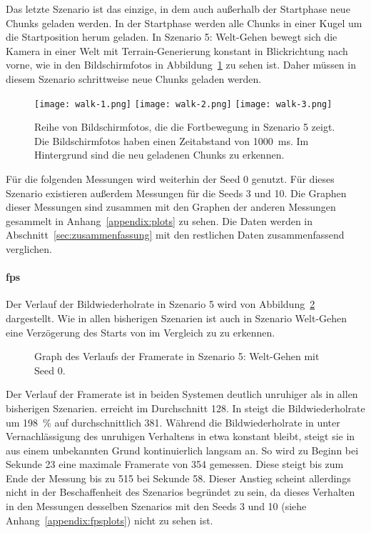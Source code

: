 Das letzte Szenario ist das einzige, in dem auch außerhalb der Startphase neue Chunks geladen werden. In der Startphase werden alle Chunks in einer Kugel um die Startposition herum geladen. In Szenario 5: Welt-Gehen bewegt sich die Kamera in einer Welt mit Terrain-Generierung konstant in Blickrichtung nach vorne, wie in den Bildschirmfotos in Abbildung~\ref{fig:walk} zu sehen ist. Daher müssen in diesem Szenario schrittweise neue Chunks geladen werden.
\begin{figure}[!htbp]
	\centering
	\texttt{[image: walk-1.png]}
	\texttt{[image: walk-2.png]}
	\texttt{[image: walk-3.png]}
	\caption[Reihe von Bildschirmfotos, die die Fortbewegung in Szenario 5 zeigt.]{Reihe von Bildschirmfotos, die die Fortbewegung in Szenario 5 zeigt. Die Bildschirmfotos haben einen Zeitabstand von \SI{1000}{\milli\second}. Im Hintergrund sind die neu geladenen Chunks zu erkennen.}\label{fig:walk}
\end{figure}

Für die folgenden Messungen wird weiterhin der Seed 0 genutzt. Für dieses Szenario existieren außerdem Messungen für die Seeds 3 und 10. Die Graphen dieser Messungen sind zusammen mit den Graphen der anderen Messungen gesammelt in Anhang~\vref{appendix:plots} zu sehen. Die Daten werden in Abschnitt~\ref{sec:zusammenfassung} mit den restlichen Daten zusammenfassend verglichen.

\paragraph{\ac{fps}}
Der Verlauf der Bildwiederholrate in Szenario 5 wird von Abbildung~\ref{fig:seed-0-walk-fps} dargestellt. Wie in allen bisherigen Szenarien ist auch in Szenario Welt-Gehen eine Verzögerung des Starts von \sysB{} im Vergleich zu \sysA{} zu erkennen.
\begin{figure}[!htbp]
	\caption{Graph des Verlaufs der Framerate in Szenario 5: Welt-Gehen mit Seed 0.}\label{fig:seed-0-walk-fps}
\end{figure}
Der Verlauf der Framerate ist in beiden Systemen deutlich unruhiger als in allen bisherigen Szenarien. \sysA{} erreicht im Durchschnitt \SI{128}{\fps}. In \sysB{} steigt die Bildwiederholrate um \SI{198}{\percent} auf durchschnittlich \SI{381}{\fps}. Während die Bildwiederholrate in \sysA{} unter Vernachlässigung des unruhigen Verhaltens in etwa konstant bleibt, steigt sie in \sysB{} aus einem unbekannten Grund kontinuierlich langsam an. So wird zu Beginn bei Sekunde 23 eine maximale Framerate von \SI{354}{\fps} gemessen. Diese steigt bis zum Ende der Messung bis zu \SI{515}{\fps} bei Sekunde 58. Dieser Anstieg scheint allerdings nicht in der Beschaffenheit des Szenarios begründet zu sein, da dieses Verhalten in den Messungen desselben Szenarios mit den Seeds 3 und 10 (siehe Anhang~\vref{appendix:fpsplots}) nicht zu sehen ist. 

